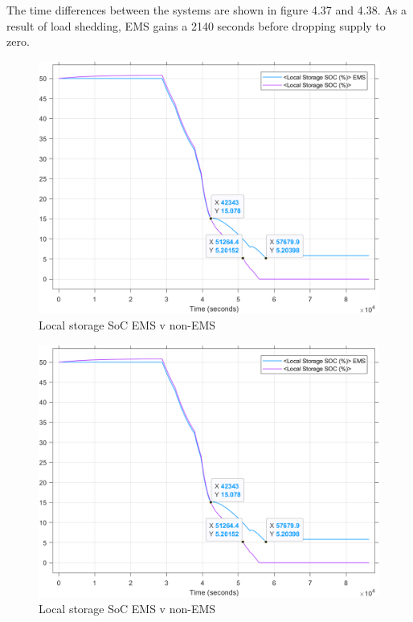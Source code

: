 The time differences between the systems are shown in figure 4.37 and 4.38. As a result of load shedding, EMS gains a 2140 seconds before dropping supply to zero.
\begin{figure}[H]
	\centering
	\includegraphics[totalheight=8cm]{Figures/local storage soc ems v non-ems2.png}
	\caption{Local storage SoC EMS v non-EMS}
\end{figure}
\begin{figure}[H]
	\centering
	\includegraphics[totalheight=8cm]{Figures/local storage soc ems v non-ems2.png}
	\caption{Local storage SoC EMS v non-EMS}
\end{figure}
